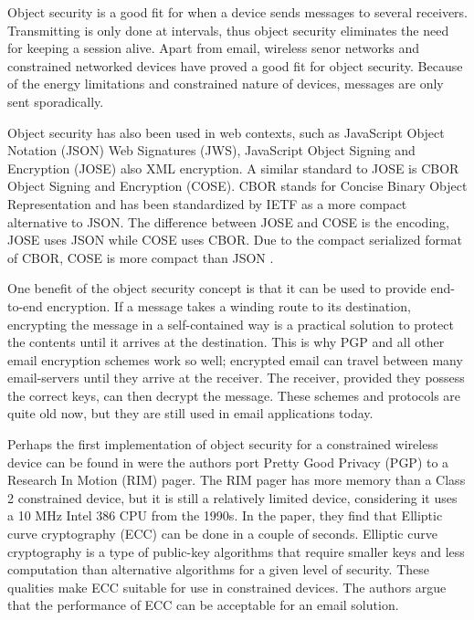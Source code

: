 Object security is a good fit for when a device sends messages to several receivers. Transmitting is only done at intervals, thus object security eliminates the need for keeping a session alive. 
Apart from email, wireless senor networks and constrained networked devices have proved a good fit for object security. Because of the energy limitations and constrained nature of devices, messages are only sent sporadically.

Object security has also been used in web contexts, such as JavaScript Object Notation (JSON) Web Signatures (JWS)\cite{jones2015json}, JavaScript Object Signing and Encryption (JOSE)\cite{barnes2014use} also XML encryption\cite{imamura2013xml}. A similar standard to JOSE is CBOR Object Signing and Encryption (COSE)\cite{schaad2017cbor}.  CBOR stands for Concise Binary Object Representation and has been standardized by IETF as a more compact alternative to JSON\cite{rfc7049}. The difference between JOSE and COSE is the encoding, JOSE uses JSON while COSE uses CBOR. Due to the compact serialized format of CBOR, COSE is more compact than JSON \cite{kalvoda2015implementace}.

One benefit of the object security concept is that it can be used to provide end-to-end encryption. If a message takes a winding route to its destination, encrypting the message in a self-contained way is a practical solution to protect the contents until it arrives at the destination. This is why PGP and all other email encryption schemes work so well; encrypted email can travel between many email-servers until they arrive at the receiver. The receiver, provided they possess the correct keys, can then decrypt the message. These schemes and protocols are quite old now, but they are still used in email applications today. 

Perhaps the first implementation of object security for a constrained wireless device can be found in \cite{brown2000pgp} were the authors port Pretty Good Privacy (PGP) to a Research In Motion (RIM) pager. The RIM pager has more memory than a Class 2 constrained device, but it is still a relatively limited device, considering it uses a 10 MHz Intel 386 CPU from the 1990s. In the paper, they find that Elliptic curve cryptography (ECC) can be done in a couple of seconds. Elliptic curve cryptography is a type of public-key algorithms that require smaller keys and less computation than alternative algorithms for a given level of security. These qualities make ECC suitable for use in constrained devices. The authors argue that the performance of ECC can be acceptable for an email solution.

